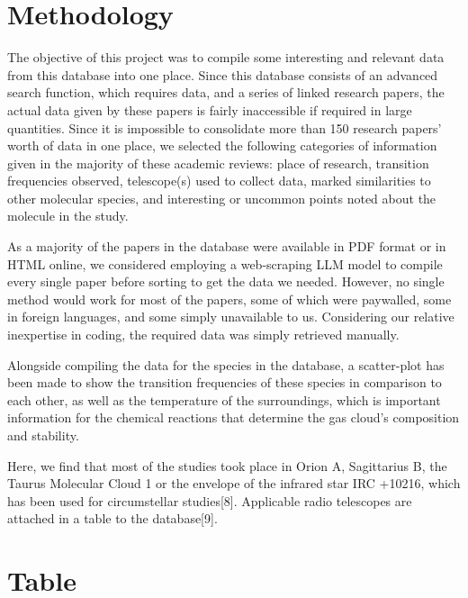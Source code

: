 \documentclass{article}
\begin{document}
\section{Methodology}

\par\indent
The objective of this project was to compile some interesting and relevant data from this database into one place. Since this database consists of an advanced search function, which requires data, and a series of linked research papers, the actual data given by these papers is fairly inaccessible if required in large quantities. Since it is impossible to consolidate more than 150 research papers' worth of data in one place, we selected the following categories of information given in the majority of these academic reviews: place of research, transition frequencies observed, telescope(s) used to collect data, marked similarities to other molecular species, and interesting or uncommon points noted about the molecule in the study.

\par
As a majority of the papers in the database were available in PDF format or in HTML online, we considered employing a web-scraping LLM model to compile every single paper before sorting to get the data we needed. However, no single method would work for most of the papers, some of which were paywalled, some in foreign languages, and some simply unavailable to us. Considering our relative inexpertise in coding, the required data was simply retrieved manually.

\par
Alongside compiling the data for the species in the database, a scatter-plot has been made to show the transition frequencies of these species in comparison to each other, as well as the temperature of the surroundings, which is important information for the chemical reactions that determine the gas cloud's composition and stability.

\par
Here, we find that most of the studies took place in Orion A, Sagittarius B, the Taurus Molecular Cloud 1 or the envelope of the infrared star IRC +10216, which has been used for circumstellar studies[8]. Applicable radio telescopes are attached in a table to the database[9].


\section{Table}
 
\end{document}
